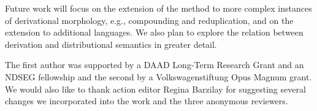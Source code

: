 \documentclass[11pt,letterpaper]{article}
\begin{document}
Future work will focus on the extension of the method to more complex
instances of derivational morphology, e.g., compounding and
reduplication, and on the extension to additional
languages. We also
plan to explore the relation between derivation
and distributional semantics in greater detail.


The first author was supported by a DAAD Long-Term Research
Grant and an NDSEG fellowship and
the second  by 
a
Volkswagenstiftung Opus Magnum grant. We would
also like to thank action editor Regina Barzilay
for suggesting several changes we incorporated
into the work and the three anonymous reviewers. 



\end{document}

